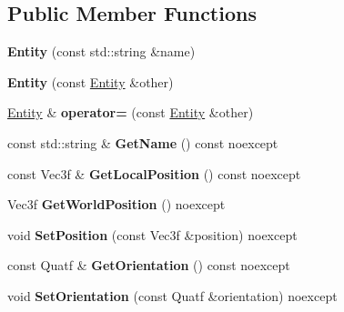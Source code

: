 \subsection*{Public Member Functions}
\begin{DoxyCompactItemize}
\item 
\mbox{\label{class_blade_1_1_entity_a6d34bb601af516537890e7eb34324887}} 
{\bfseries Entity} (const std\+::string \&name)
\item 
\mbox{\label{class_blade_1_1_entity_a78520c1c2c0e3bc3e259053d4299da92}} 
{\bfseries Entity} (const \hyperlink{class_blade_1_1_entity}{Entity} \&other)
\item 
\mbox{\label{class_blade_1_1_entity_a55d9348cb6292911799415ca9a344dfc}} 
\hyperlink{class_blade_1_1_entity}{Entity} \& {\bfseries operator=} (const \hyperlink{class_blade_1_1_entity}{Entity} \&other)
\item 
\mbox{\label{class_blade_1_1_entity_a8a71a64caa88b47b6218174a2cde1308}} 
const std\+::string \& {\bfseries Get\+Name} () const noexcept
\item 
\mbox{\label{class_blade_1_1_entity_a68bc45aa86d40320388cad65ad7f9e0d}} 
const Vec3f \& {\bfseries Get\+Local\+Position} () const noexcept
\item 
\mbox{\label{class_blade_1_1_entity_a3cd447ee5d8945ce3b17986ee7ed528a}} 
Vec3f {\bfseries Get\+World\+Position} () noexcept
\item 
\mbox{\label{class_blade_1_1_entity_a451527105bd9298c9dc04f2afdedd9c5}} 
void {\bfseries Set\+Position} (const Vec3f \&position) noexcept
\item 
\mbox{\label{class_blade_1_1_entity_ad1f7d81b8247f69ff497f176ccd6f1d5}} 
const Quatf \& {\bfseries Get\+Orientation} () const noexcept
\item 
\mbox{\label{class_blade_1_1_entity_af0644051f5dc7524143ac3088167b736}} 
void {\bfseries Set\+Orientation} (const Quatf \&orientation) noexcept

\end{DoxyCompactItemize}

